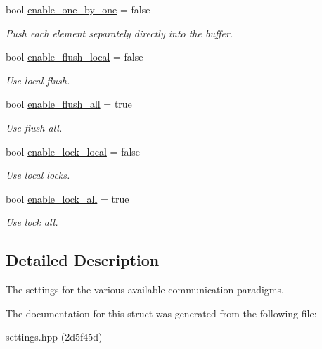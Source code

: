 \begin{DoxyCompactItemize}
bool \hyperlink{structSchwarzWrappers_1_1Settings_1_1comm__settings_a94a65410d1c436a47dbb116b5d3d5af1}{enable\+\_\+one\+\_\+by\+\_\+one} = false
\begin{DoxyCompactList}\small\item\em Push each element separately directly into the buffer. \end{DoxyCompactList}\item 
\mbox{\label{structSchwarzWrappers_1_1Settings_1_1comm__settings_a70c60458477096cecd87a53139ee61e8}} 
bool \hyperlink{structSchwarzWrappers_1_1Settings_1_1comm__settings_a70c60458477096cecd87a53139ee61e8}{enable\+\_\+flush\+\_\+local} = false
\begin{DoxyCompactList}\small\item\em Use local flush. \end{DoxyCompactList}\item 
\mbox{\label{structSchwarzWrappers_1_1Settings_1_1comm__settings_a147d1ec7e1eaa5bea9e640d0bb6a7636}} 
bool \hyperlink{structSchwarzWrappers_1_1Settings_1_1comm__settings_a147d1ec7e1eaa5bea9e640d0bb6a7636}{enable\+\_\+flush\+\_\+all} = true
\begin{DoxyCompactList}\small\item\em Use flush all. \end{DoxyCompactList}\item 
\mbox{\label{structSchwarzWrappers_1_1Settings_1_1comm__settings_aef1f78be36243e63b9ef7c04dee35f1b}} 
bool \hyperlink{structSchwarzWrappers_1_1Settings_1_1comm__settings_aef1f78be36243e63b9ef7c04dee35f1b}{enable\+\_\+lock\+\_\+local} = false
\begin{DoxyCompactList}\small\item\em Use local locks. \end{DoxyCompactList}\item 
\mbox{\label{structSchwarzWrappers_1_1Settings_1_1comm__settings_a9158358e7f737ae5769c5c51730dee7b}} 
bool \hyperlink{structSchwarzWrappers_1_1Settings_1_1comm__settings_a9158358e7f737ae5769c5c51730dee7b}{enable\+\_\+lock\+\_\+all} = true
\begin{DoxyCompactList}\small\item\em Use lock all. \end{DoxyCompactList}\end{DoxyCompactItemize}


\subsection{Detailed Description}
The settings for the various available communication paradigms. 

The documentation for this struct was generated from the following file\+:\begin{DoxyCompactItemize}
\item 
settings.\+hpp (2d5f45d)\end{DoxyCompactItemize}
